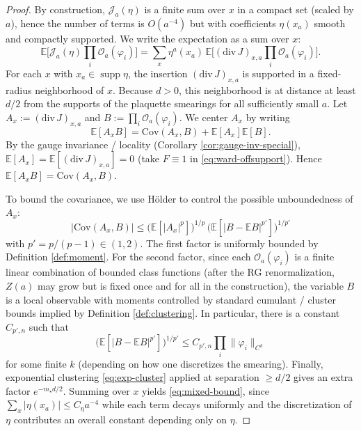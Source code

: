 \documentclass[11pt]{article}
\theoremstyle{definition}
\newcommand{\E}{\mathbb{E}}
\newcommand{\Cov}{\mathrm{Cov}}
\newcommand{\1}{\mathbf{1}}
\newcommand{\supp}{\operatorname{supp}}
\begin{document}
\begin{proof}
By construction, $\mathcal{J}_a(\eta)$ is a finite sum over $x$ in a compact set (scaled by $a$), hence the number of terms is $O(a^{-4})$ but with coefficients $\eta(x_a)$ smooth and compactly supported.
We write the expectation as a sum over $x$:
\begin{equation*}
\E\Big[\mathcal{J}_a(\eta)\prod_i \mathcal{O}_a(\varphi_i)\Big]
=\sum_x \eta^a(x_a)\,\E\Big[(\mathrm{div}\,J)_{x,a}\prod_i \mathcal{O}_a(\varphi_i)\Big].
\end{equation*}
For each $x$ with $x_a\in\supp\eta$, the insertion $(\mathrm{div}\,J)_{x,a}$ is supported in a fixed-radius neighborhood of $x$.
Because $d>0$, this neighborhood is at distance at least $d/2$ from the supports of the plaquette smearings for all sufficiently small $a$.
Let $A_x:=(\mathrm{div}\,J)_{x,a}$ and $B:=\prod_i \mathcal{O}_a(\varphi_i)$.
We center $A_x$ by writing
\begin{equation*}
\E[A_x B]=\Cov(A_x,B)+\E[A_x]\E[B].
\end{equation*}
By the gauge invariance / locality (Corollary \ref{cor:gauge-inv-special}), $\E[A_x]=\E[(\mathrm{div}\,J)_{x,a}]=0$ (take $F\equiv 1$ in \eqref{eq:ward-offsupport}).
Hence $\E[A_xB]=\Cov(A_x,B)$.

To bound the covariance, we use H\"older to control the possible unboundedness of $A_x$:
\begin{equation*}
|\Cov(A_x,B)|\le \big(\E[|A_x|^p]\big)^{1/p}\,\big(\E[|B-\E B|^{p'}]\big)^{1/p'}
\end{equation*}
with $p' = p/(p-1)\in(1,2)$.
The first factor is uniformly bounded by Definition \ref{def:moment}.
For the second factor, since each $\mathcal O_a(\varphi_i)$ is a finite linear combination of bounded class functions (after the RG renormalization, $Z(a)$ may grow but is fixed once and for all in the construction), the variable $B$ is a local observable with moments controlled by standard cumulant / cluster bounds implied by Definition \ref{def:clustering}. In particular, there is a constant $C_{p',n}$ such that
\begin{equation*}
\big(\E[|B-\E B|^{p'}]\big)^{1/p'}\le C_{p',n} \prod_i \|\varphi_i\|_{C^k}
\end{equation*}
for some finite $k$ (depending on how one discretizes the smearing).
Finally, exponential clustering \eqref{eq:exp-cluster} applied at separation $\ge d/2$ gives an extra factor $e^{-m_\star d/2}$.
Summing over $x$ yields \eqref{eq:mixed-bound}, since $\sum_x |\eta(x_a)| \le C_\eta a^{-4}$ while each term decays uniformly and the discretization of $\eta$ contributes an overall constant depending only on $\eta$.
\end{proof}
\end{document}
